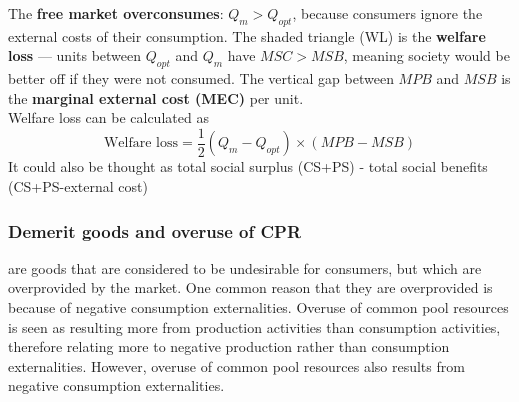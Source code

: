 \begin{center}
\end{center}
The \textbf{free market overconsumes}: $Q_m > Q_{opt}$, because consumers ignore the external costs of their consumption. The shaded triangle (WL) is the \textbf{welfare loss} --- units between $Q_{opt}$ and $Q_m$ have $MSC > MSB$, meaning society would be better off if they were not consumed. The vertical gap between $MPB$ and $MSB$ is the \textbf{marginal external cost (MEC)} per unit.\\
Welfare loss can be calculated as
\[\text{Welfare loss}=\dfrac{1}{2}(Q_m-Q_{opt})\times (MPB-MSB)\]
It could also be thought as total social surplus (CS+PS) - total social benefits (CS+PS-external cost)
\subsubsection*{Demerit goods and overuse of CPR}
 are goods that are considered to be undesirable for consumers, but which are overprovided by the market. One common reason that they are overprovided is because of negative consumption externalities. Overuse of common pool resources is seen as resulting more from production activities than consumption activities, therefore relating more to negative production rather than consumption externalities. However, overuse of common pool resources also results from negative consumption externalities.
